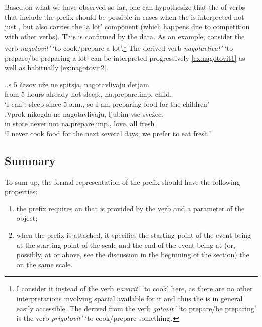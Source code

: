 Based on what we have observed so far, one can hypothesize that the  of  verbs that include the  prefix  should be possible in cases when the  is interpreted not just , but also carries the `a lot' component (which happens due to competition with other verbs). This is confirmed by the data. As an example, consider the verb \textit{nagotovit'} `to cook/prepare a lot'.\footnote{I consider it instead of the verb \textit{navarit'} `to cook' here, as there are no other interpretations involving spacial  available for it and thus the  is in general easily accessible. The  derived from the verb \textit{gotovit'} `to prepare/be preparing' is the verb \textit{prigotovit'} `to cook/prepare something'.}  The derived  verb \textit{nagotavlivat'} `to prepare/be preparing a lot' can be interpreted progressively \ref{ex:nagotovit1} as well as habitually \ref{ex:nagotovit2}.

\ex.\label{ex:nagotovit}\ag.\label{ex:nagotovit1}s 5 \v{c}asov u\v{z}e ne spitsja, nagotavlivaju detjam\\
from 5 hours already not sleep., na.prepare.imp. child.\\
\trans `I can't sleep since 5 a.m., so I am preparing food for the children'\\
\bg.\label{ex:nagotovit2}Vprok nikogda ne nagotavlivaju, ljubim vse sve\v{z}ee.\\
{in store} never not na.prepare.imp., love. all fresh\\
\trans `I never cook food for the next several days, we prefer to eat fresh.'\\

\subsection{Summary} 
To sum up, the formal representation of the  prefix  should have the following properties: 
\begin{enumerate}
\item the prefix requires an  that is provided by the verb and a parameter of the object;
\item when the prefix is attached, it specifies the starting point of the event being at the starting point of the scale and the end of the event being at (or, possibly, at or above, see the discussion in the beginning of the section) the  on the same scale.
\end{enumerate}

